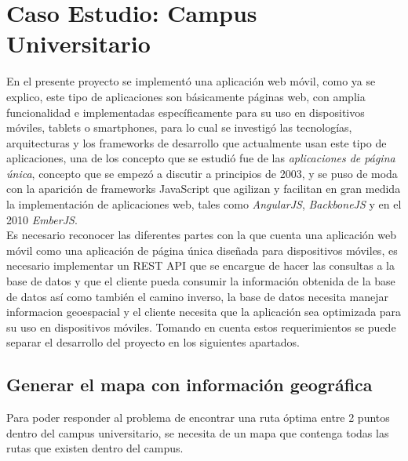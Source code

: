 \chapter{Caso Estudio: Campus Universitario}
\label{chap:Caso Estudio: Campus Universitario}


En el presente proyecto se implementó una aplicación web móvil, como ya se explico, este tipo de aplicaciones son básicamente páginas web, con amplia funcionalidad e implementadas específicamente para su uso en dispositivos móviles, tablets o smartphones, para lo cual se investigó las tecnologías, arquitecturas y los frameworks de desarrollo que actualmente usan este tipo de aplicaciones, una de los concepto que se estudió fue de las \emph{aplicaciones de página única}, concepto que se empezó a discutir a principios de 2003, y se puso de moda con la aparición de frameworks JavaScript que agilizan y facilitan en gran medida la implementación de aplicaciones web, tales como \emph{AngularJS}, \emph{BackboneJS} y en el 2010 \emph{EmberJS}. \\

Es necesario reconocer las diferentes partes con la que cuenta una aplicación web móvil como una aplicación de página única diseñada para dispositivos móviles, es necesario implementar un REST API que se encargue de hacer las consultas a la base de datos y que el cliente pueda consumir la información obtenida de la base de datos así como también el camino inverso, la base de datos necesita manejar informacion geoespacial y el cliente necesita que la aplicación sea optimizada para su uso en dispositivos móviles. Tomando en cuenta estos requerimientos se puede separar el desarrollo del proyecto en los siguientes apartados. \\



\section{Generar el mapa con información geográfica}
\label{sec:generar_mapa_rutas}

Para poder responder al problema de encontrar una ruta óptima entre 2 puntos dentro del campus universitario, se necesita de un mapa que contenga todas las rutas que existen dentro del campus.\\


